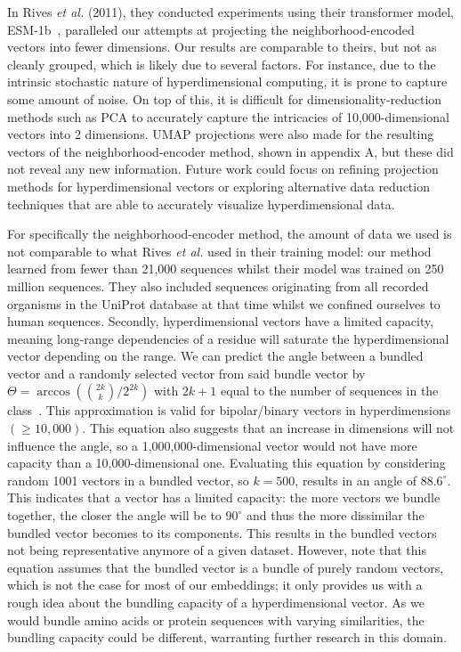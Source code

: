 In Rives \textit{et al.} (2011), they conducted experiments using their transformer model, ESM-1b~\cite{esm}, paralleled our attempts at projecting the neighborhood-encoded vectors into fewer dimensions. Our results are comparable to theirs, but not as cleanly grouped, which is likely due to several factors. For instance, due to the intrinsic stochastic nature of hyperdimensional computing, it is prone to capture some amount of noise. On top of this, it is difficult for dimensionality-reduction methods such as PCA to accurately capture the intricacies of 10,000-dimensional vectors into 2 dimensions. UMAP projections were also made for the resulting vectors of the neighborhood-encoder method, shown in appendix A, but these did not reveal any new information. Future work could focus on refining projection methods for hyperdimensional vectors or exploring alternative data reduction techniques that are able to accurately visualize hyperdimensional data. 

For specifically the neighborhood-encoder method, the amount of data we used is not comparable to what Rives \textit{et al.} used in their training model: our method learned from fewer than 21,000 sequences whilst their model was trained on 250 million sequences. They also included sequences originating from all recorded organisms in the UniProt database at that time whilst we confined ourselves to human sequences. Secondly, hyperdimensional vectors have a limited capacity, meaning long-range dependencies of a residue will saturate the hyperdimensional vector depending on the range. We can predict the angle between a bundled vector and a randomly selected vector from said bundle vector by $\Theta = \arccos({2k \choose k}/2^{2k})$ with $2k+1$ equal to the number of sequences in the class~\cite{sathdv}. This approximation is valid for bipolar/binary vectors in hyperdimensions $(\ge 10,000)$. This equation also suggests that an increase in dimensions will not influence the angle, so a 1,000,000-dimensional vector would not have more capacity than a 10,000-dimensional one. Evaluating this equation by considering random 1001 vectors in a bundled vector, so $k = 500$, results in an angle of $88.6^{\circ}$. This indicates that a vector has a limited capacity: the more vectors we bundle together, the closer the angle will be to $90^{\circ}$ and thus the more dissimilar the bundled vector becomes to its components. This results in the bundled vectors not being representative anymore of a given dataset. However, note that this equation assumes that the bundled vector is a bundle of purely random vectors, which is not the case for most of our embeddings; it only provides us with a rough idea about the bundling capacity of a hyperdimensional vector. As we would bundle amino acids or protein sequences with varying similarities, the bundling capacity could be different, warranting further research in this domain.

